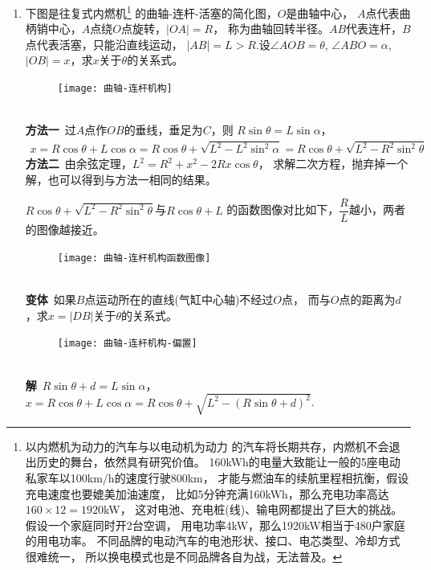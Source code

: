 \begin{enumerate}[label={【\textbf{例\thechapter.\arabic*}】},
 leftmargin=\inteval{\myenumleftmargin}pt,
 itemsep=\inteval{\myenumitempsep}pt,
 itemindent=\inteval{\myenumitemindent}pt]
\item 下图是往复式内燃机\footnote{以内燃机为动力的汽车与以电动机为动力
    的汽车将长期共存，内燃机不会退出历史的舞台，依然具有研究价值。
    160kWh的电量大致能让一般的5座电动私家车以100km/h的速度行驶800km，
    才能与燃油车的续航里程相抗衡，假设充电速度也要媲美加油速度，
    比如5分钟充满160kWh，那么充电功率高达$ 160\times 12=1920 $kW，
    这对电池、充电桩(线)、输电网都提出了巨大的挑战。假设一个家庭同时开2台空调，
    用电功率4kW，那么1920kW相当于480户家庭的用电功率。
    不同品牌的电动汽车的电池形状、接口、电芯类型、冷却方式很难统一，
    所以换电模式也是不同品牌各自为战，无法普及。}
的曲轴-连杆-活塞的简化图，$ O $是曲轴中心，
$ A $点代表曲柄销中心，$ A $点绕$ O $点旋转，$ |OA|=R $，
称为曲轴回转半径。$ AB $代表连杆，$ B $点代表活塞，只能沿直线运动，
$ |AB|=L>R $.设$ \angle AOB=\theta $, $ \angle ABO=\alpha $, 
$ |OB|=x $，求$ x $关于$ \theta $的关系式。
\begin{figure}[h]
\centering
\texttt{[image: 曲轴-连杆机构]}
\end{figure} \\
\textbf{方法一}\ 过$ A $点作$ OB $的垂线，垂足为$ C $，则
$ R\sin\theta=L\sin\alpha $，
\begin{align*}
x =R\cos\theta+L\cos\alpha=R\cos\theta+\sqrt{L^2-L^2\sin^2\alpha} 
=R\cos\theta+\sqrt{L^2-R^2\sin^2\theta}
\end{align*}
\textbf{方法二}\ 由余弦定理，$ L^2=R^2+x^2-2Rx\cos\theta $，
求解二次方程，抛弃掉一个解，也可以得到与方法一相同的结果。

$ R\cos\theta+\sqrt{L^2-R^2\sin^2\theta} $与$ R\cos\theta+L $
的函数图像对比如下，$ \dfrac{R}{L} $越小，两者的图像越接近。
\begin{figure}[h]
\centering
\texttt{[image: 曲轴-连杆机构函数图像]}
\end{figure} 
\\
\textbf{变体}\ 如果$ B $点运动所在的直线(气缸中心轴)不经过$ O $点，
而与$ O $点的距离为$ d $，求$ x=|DB| $关于$ \theta $的关系式。
\begin{figure}[h]
\centering
\texttt{[image: 曲轴-连杆机构-偏置]}
\end{figure} \\
\textbf{解}\ $ R\sin\theta+d=L\sin\alpha $，
$ x=R\cos\theta+L\cos\alpha=R\cos\theta+\sqrt{L^2-(R\sin\theta+d)^2} $.


\end{enumerate}
